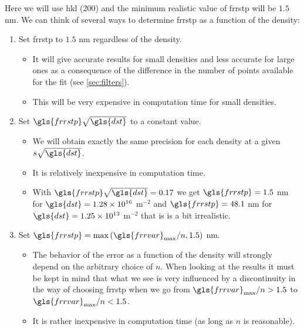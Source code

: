 {\renewcommand{\arraystretch}{1.6}




\bigskip

Here we will use hkl (200) and the minimum realistic value of \gls{frrstp} will be \( 1.5 \) nm.
We can think of several ways to determine \gls{frrstp} as a function of the density:
\begin{enumerate}
\item Set \gls{frrstp} to \( 1.5 \) nm regardless of the density.
\begin{itemize}
\item It will give accurate results for small densities and less accurate for large ones as a consequence of the difference in the number of points available for the fit (see \ref{sec:filters}).
\item This will be very expensive in computation time for small densities.
\end{itemize}
\item Set \( \gls{frrstp} \sqrt{\gls{dst}} \) to a constant value.
\begin{itemize}
\item We will obtain exactly the same precision for each density at a given \( s \sqrt{\gls{dst}} \).
\item It is relatively inexpensive in computation time.
\item With \( \gls{frrstp} \sqrt{\gls{dst}} = 0.17 \) we get \( \gls{frrstp} = 1.5 \) nm for \( \gls{dst} = 1.28 \times 10^{16} \) m\( ^{-2} \) and \( \gls{frrstp} = 48.1 \) nm for \( \gls{dst} = 1.25 \times 10^{13} \) m\( ^{-2} \) that is is a bit irrealistic.
\end{itemize}
\item Set \( \gls{frrstp} = \max \left(\gls{frrvar}_{\mathrm{max}}/n, 1.5 \right) \) nm.
\begin{itemize}
\item The behavior of the error as a function of the density will strongly depend on the arbitrary choice of \( n \). When looking at the results it must be kept in mind that what we see is very influenced by a discontinuity in the way of choosing \gls{frrstp} when we go from \( \gls{frrvar}_{\mathrm{max}}/n > 1.5 \) to \( \gls{frrvar}_{\mathrm{max}}/n < 1.5 \).
\item It is rather inexpensive in computation time (as long as \( n \) is reasonable).
\end{itemize}
\end{enumerate}

}
